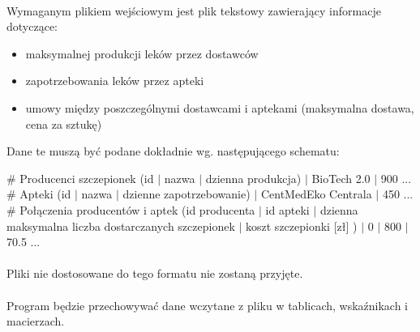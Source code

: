 \documentclass{article}
\begin{document}
\newpage


\paragraph{}

Wymaganym plikiem wejściowym jest plik tekstowy zawierający informacje dotyczące:

\begin{itemize}
	\item maksymalnej produkcji leków przez dostawców
	\item zapotrzebowania leków przez apteki
	\item umowy między poszczególnymi dostawcami i aptekami (maksymalna dostawa, cena za sztukę)
\end{itemize}

Dane te muszą być podane dokładnie wg. następującego schematu: \newline

\noindent
\#  Producenci szczepionek (id $|$ nazwa $|$ dzienna produkcja)  $|$ BioTech 2.0 $|$ 900 \newline
... \newline
\# Apteki (id $|$ nazwa $|$ dzienne zapotrzebowanie)  $|$ CentMedEko Centrala $|$ 450 \newline
... \newline
\# Połączenia producentów i aptek (id producenta $|$ id apteki $|$ dzienna maksymalna liczba dostarczanych szczepionek $|$ koszt szczepionki [zł] )  $|$ 0 $|$ 800 $|$ 70.5 \newline
...

\paragraph{}

Pliki nie dostosowane do tego formatu nie zostaną przyjęte.

\paragraph{}

Program będzie przechowywać dane wczytane z pliku w tablicach, wskaźnikach i macierzach.

\paragraph{}
\end{document}
